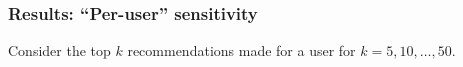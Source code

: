 \documentclass{beamer}
\begin{document}
\begin{frame}
\frametitle{Results: ``Per-user'' sensitivity}
Consider the top $k$ recommendations made for a user for $k = 5, 10, \dots, 50$.
\begin{figure}[h]
  \begin{center}
  \end{center}
\end{figure}
\end{frame}
\end{document}
